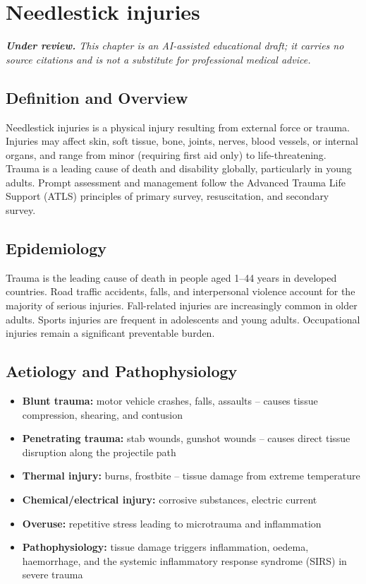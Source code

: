 \chapter{Needlestick injuries}

\medskip
\noindent\textit{\textbf{Under review.} This chapter is an AI-assisted educational draft; it carries no source citations and is not a substitute for professional medical advice.}

\section*{Definition and Overview}
Needlestick injuries is a physical injury resulting from external force or trauma. Injuries may affect skin, soft tissue, bone, joints, nerves, blood vessels, or internal organs, and range from minor (requiring first aid only) to life-threatening. Trauma is a leading cause of death and disability globally, particularly in young adults. Prompt assessment and management follow the Advanced Trauma Life Support (ATLS) principles of primary survey, resuscitation, and secondary survey.

\section*{Epidemiology}
Trauma is the leading cause of death in people aged 1--44 years in developed countries. Road traffic accidents, falls, and interpersonal violence account for the majority of serious injuries. Fall-related injuries are increasingly common in older adults. Sports injuries are frequent in adolescents and young adults. Occupational injuries remain a significant preventable burden.

\section*{Aetiology and Pathophysiology}
\begin{itemize}
    \item \textbf{Blunt trauma:} motor vehicle crashes, falls, assaults -- causes tissue compression, shearing, and contusion
    \item \textbf{Penetrating trauma:} stab wounds, gunshot wounds -- causes direct tissue disruption along the projectile path
    \item \textbf{Thermal injury:} burns, frostbite -- tissue damage from extreme temperature
    \item \textbf{Chemical/electrical injury:} corrosive substances, electric current
    \item \textbf{Overuse:} repetitive stress leading to microtrauma and inflammation
    \item \textbf{Pathophysiology:} tissue damage triggers inflammation, oedema, haemorrhage, and the systemic inflammatory response syndrome (SIRS) in severe trauma
\end{itemize}

